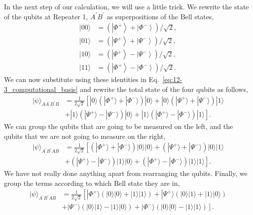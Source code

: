 In the next step of our calculation, we will use a little trick.
We rewrite the state of the qubits at Repeater 1, $A^{\prime}B^{\prime}$ as superpositions of the Bell states,
\begin{align}
|00\rangle & = \left(\left|\Phi^{+}\right\rangle+\left|\Phi^{-}\right\rangle\right) / \sqrt{2}, \\
|01\rangle & = \left(\left|\Psi^{+}\right\rangle+\left|\Psi^{-}\right\rangle\right) / \sqrt{2}, \\
|10\rangle & = \left(\left|\Psi^{+}\right\rangle-\left|\Psi^{-}\right\rangle\right) / \sqrt{2}, \\
|11\rangle & = \left(\left|\Phi^{+}\right\rangle-\left|\Phi^{-}\right\rangle\right) / \sqrt{2}.
\end{align}
We can now substitute using these identities in Eq.~\ref{eq:12-3_computational_basis} and rewrite the total state of the four qubits as follows,
\begin{align}
    |\psi\rangle_{AA^{\prime}B^{\prime}B} & = \frac{1}{2\sqrt{2}} \left[ |0\rangle (|\Phi^+\rangle + |\Phi^-\rangle) |0\rangle + |0\rangle (|\Psi^+\rangle + |\Psi^-\rangle) |1\rangle \right. \nonumber\\
    & + \left. |1\rangle (|\Psi^+\rangle - |\Psi^-\rangle) |0\rangle + |1\rangle (|\Phi^+\rangle - |\Phi^-\rangle) |1\rangle \right].
\end{align}
We can group the qubits that are going to be measured on the left, and the qubits that we are not going to measure on the right,
\begin{align}
    |\psi\rangle_{A^{\prime}B^{\prime}AB} & = \frac{1}{2\sqrt{2}} \left[ (|\Phi^+\rangle + |\Phi^-\rangle)|0\rangle|0\rangle + (|\Psi^+\rangle + |\Psi^-\rangle)|0\rangle|1\rangle \right. \nonumber\\
    & + \left. (|\Psi^+\rangle - |\Psi^-\rangle)|1\rangle|0\rangle + (|\Phi^+\rangle - |\Phi^-\rangle)|1\rangle|1\rangle \right].
\end{align}
We have not really done anything apart from rearranging the qubits.
Finally, we group the terms according to which Bell state they are in,
\begin{align}
    |\psi\rangle_{A^{\prime}B^{\prime}AB} & = \frac{1}{2\sqrt{2}} \left[ |\Phi^+\rangle (|0\rangle|0\rangle + |1\rangle|1\rangle) + |\Psi^+\rangle (|0\rangle|1\rangle + |1\rangle|0\rangle) \right. \nonumber\\
    & + \left. |\Psi^-\rangle (|0\rangle|1\rangle - |1\rangle|0\rangle) + |\Phi^-\rangle (|0\rangle|0\rangle - |1\rangle|1\rangle) \right].
    \label{eq:12-3_almost_final}
\end{align}

